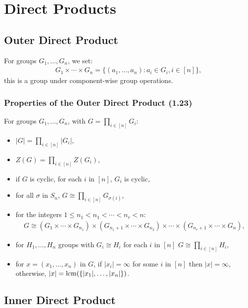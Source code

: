 \section{Direct Products}

\subsection{Outer Direct Product}

For groups $G_1, \ldots, G_n$, we set: \begin{align*}
    G_1 \times \cdots \times G_n = \{(a_1, \ldots, a_n) : a_i \in G_i, i \in [n] \},
\end{align*} this is a group under component-wise group operations.

\subsubsection{Properties of the Outer Direct Product (1.23)} \label{1.23}

For groups $G_1, \ldots, G_n$, with $G = \prod_{i \in [n]} G_i$: \begin{itemize}
    \item $|G| = \prod_{i \in [n]}|G_i|$,
    \item $Z(G) = \prod_{i \in [n]}Z(G_i)$,
    \item if $G$ is cyclic, for each $i$ in $[n]$, $G_i$ is cyclic,
    \item for all $\sigma$ in $S_n$, $G \cong \prod_{i \in [n]} G_{\sigma(i)}$,
    \item for the integers $1 \leq n_1 < n_1 < \cdots < n_r < n$:
        \begin{gather*}
            G \cong 
            (G_1 \times \cdots \times G_{n_1}) \times 
            (G_{n_1 + 1} \times \cdots \times G_{n_2}) \times \cdots \times
            (G_{n_r + 1} \times \cdots \times G_n),
        \end{gather*}
    \item for $H_1, \ldots, H_n$ groups with $G_i \cong H_i$ for each $i$ in $[n]$
        $G \cong \prod_{i \in [n]} H_i$,
    \item for $x = (x_1, \ldots, x_n)$ in $G$, if $|x_i| = \infty$ for some
        $i$ in $[n]$ then $|x| = \infty$, otherwise, $|x| = \operatorname{lcm}(\{|x_1|, \ldots, |x_n|\})$.
\end{itemize}

\subsection{Inner Direct Product}

